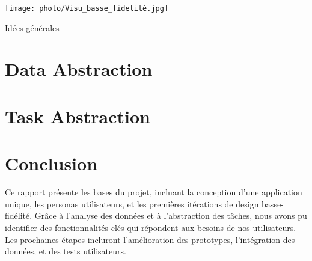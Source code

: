 \documentclass{article}
\begin{document}
\texttt{[image: photo/Visu\_basse\_fidelité.jpg]}\caption{Idées générales}

\section{Data Abstraction}


\section{Task Abstraction}


\section{Conclusion}
Ce rapport présente les bases du projet, incluant la conception d'une application unique, les personas utilisateurs, et les premières itérations de design basse-fidélité. 
Grâce à l'analyse des données et à l'abstraction des tâches, nous avons pu identifier des fonctionnalités clés qui répondent aux besoins de nos utilisateurs. 
Les prochaines étapes incluront l'amélioration des prototypes, l'intégration des données, et des tests utilisateurs.
\end{document}
